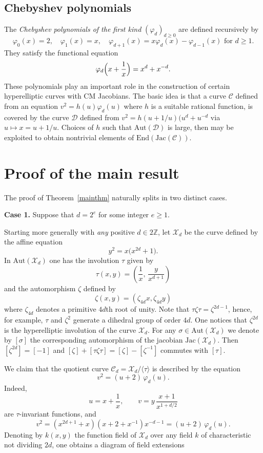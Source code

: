\documentclass[a4paper,12pt]{amsart}
\def\cC{{\mathcal C}}
\def\cX{{\mathcal X}}
\def\cD{{\mathcal D}}
\numberwithin{equation}{section}
\theoremstyle{plain}
\numberwithin{thm}{section}
\begin{document}
\subsection{Chebyshev polynomials}
The \emph{Chebyshev polynomials of the first kind} $(\varphi_d)_{d\ge 0}$ are defined recursively by
\[
\varphi_0(x) = 2, \quad \varphi_1(x) = x, \quad \varphi_{d+1}(x) = x \varphi_d(x) - \varphi_{d-1}(x) \text{ for } d\ge 1.
\]
They satisfy the functional equation
\[
\varphi_d\Bigl(x + \frac{1}{x}\Bigr) = x^d + x^{-d}.
\]
These polynomials play an important role in the construction of certain hyperelliptic curves with CM Jacobians.
The basic idea is that a curve $\cC$ defined from an
equation $v^2=h(u)\varphi_d(u)$ where $h$ is a suitable
rational function, is covered by the curve $\cD$ defined from
$v^2=h(u+1/u)(u^d+u^{-d}$ via $u\mapsto x=u+1/u$.
Choices of $h$ such that $\textrm{Aut}(\cD)$ is large, then
may be exploited to obtain nontrivial elements of
$\textrm{End}(\textrm{Jac}(\cC))$.

\section{Proof of the main result}

The proof of Theorem~\ref{mainthm}
naturally splits in two distinct cases. 

\medskip
\noindent
\textbf{Case 1.} Suppose that $d=2^{e}$ for some integer $e\geq 1$.  

Starting more generally with {\em any}
positive $d\in 2\mathbb{Z}$, let $\cX_d$ be the curve defined by the affine equation
\[
y^{2} = x\bigl(x^{2d} + 1\bigr).
\]
In $\text{Aut}(\cX_d)$ one has the involution $\tau$ given by
\[
\tau(x,y) = \left( \frac{1}{x}, \, \frac{y}{x^{d+1}} \right)
\]
and the automorphism $\zeta$ defined by
\[ \zeta(x,y) = (\zeta_{4d}x,\zeta_{4d}y)\]
where $\zeta_{4d}$ denotes a primitive $4d$th root of unity.
Note that $\tau\zeta\tau=\zeta^{2d-1}$,
hence, for example, $\tau$ and $\zeta^2$ generate a dihedral group of
order $4d$. One notices that
$\zeta^{2d}$ is the hyperelliptic involution of the curve $\cX_d$.
For any $\sigma\in\textrm{Aut}(\cX_d)$
we denote by $[\sigma]$ the corresponding automorphism of the
jacobian $\textrm{Jac}(\cX_d)$.
Then $[\zeta^{2d}]=[-1]$
and $[\zeta]+[\tau\zeta\tau]=[\zeta]-[\zeta^{-1}]$ commutes with $[\tau]$.



We claim that the quotient curve $\cC_d = \cX_d / \langle \tau \rangle$ is described by the equation
\[
v^{2} = (u + 2)\,\varphi_{d}(u).
\]
Indeed, 
\[
u = x + \frac{1}{x}, 
\qquad 
v = y\,\frac{x + 1}{x^{1 + d/2}}
\]
are $\tau$-invariant functions, and
\[
v^{2} = (x^{2d+1}+x)(x+2+x^{-1})x^{-d-1}=(u + 2)\,\varphi_{d}(u).
\]
Denoting by $k(x,y)$ the function field of $\cX_d$ over any field $k$
of characteristic not dividing $2d$, 
one obtains a diagram of field extensions
\end{document}
